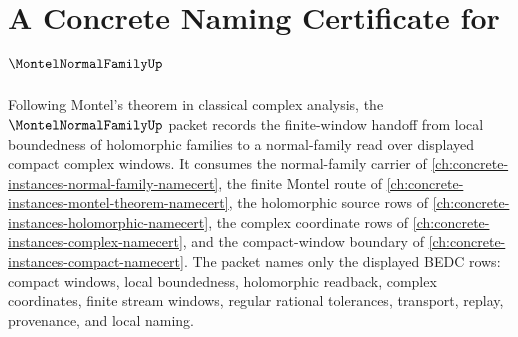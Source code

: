 \chapter{A Concrete Naming Certificate for $\MontelNormalFamilyUp$}
\label{ch:concrete-instances-montel-normal-family-namecert}

Following Montel's theorem in classical complex analysis, the $\MontelNormalFamilyUp$ packet records the finite-window handoff from local boundedness of holomorphic families to a normal-family read over displayed compact complex windows. It consumes the normal-family carrier of \autoref{ch:concrete-instances-normal-family-namecert}, the finite Montel route of \autoref{ch:concrete-instances-montel-theorem-namecert}, the holomorphic source rows of \autoref{ch:concrete-instances-holomorphic-namecert}, the complex coordinate rows of \autoref{ch:concrete-instances-complex-namecert}, and the compact-window boundary of \autoref{ch:concrete-instances-compact-namecert}. The packet names only the displayed BEDC rows: compact windows, local boundedness, holomorphic readback, complex coordinates, finite stream windows, regular rational tolerances, transport, replay, provenance, and local naming.

